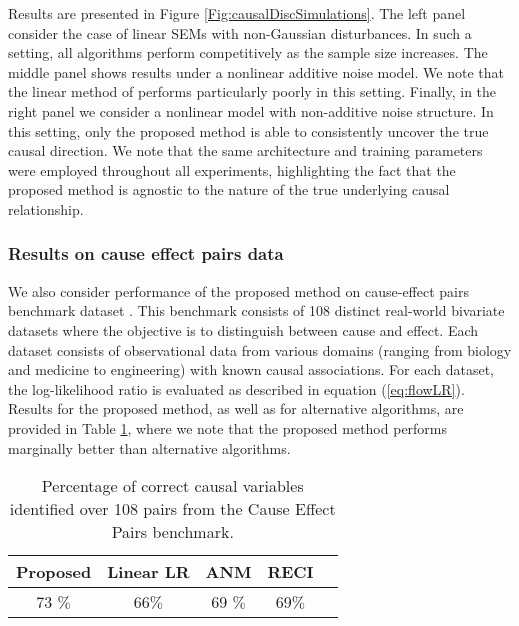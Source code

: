 \documentclass{article}
\begin{document}
Results are presented in Figure \ref{Fig:causalDiscSimulations}. 
The left panel consider the case of linear SEMs with non-Gaussian disturbances. In such a setting, all
algorithms perform competitively as the sample size increases. 
The middle panel shows results under a nonlinear additive noise model.
We note that the linear method of \cite{Hyvarinen2013} performs particularly 
poorly in this setting. 
Finally, in the right panel we consider a nonlinear model with non-additive noise structure. 
In this setting, only the proposed method is able to consistently uncover the true causal direction. 
We note that the same 
architecture and training parameters were employed throughout all experiments,
highlighting the fact that the 
proposed method is agnostic to the nature of the true 
underlying causal relationship. 


\subsubsection*{Results on cause effect pairs data}

We also consider performance of the proposed method on cause-effect pairs benchmark dataset
\citep{mooij2016distinguishing}. 
This benchmark consists of  108 distinct  
real-world  bivariate datasets where the objective is to distinguish between cause and effect.
Each dataset consists of observational data from various domains (ranging from biology and medicine to engineering) with known causal associations. 
For each dataset,  the log-likelihood ratio is evaluated as described in equation 
(\ref{eq:flowLR}). 
%
Results for the proposed method, as well as for alternative algorithms, are provided in Table 
\ref{sample-table}, where we note that the proposed method performs marginally better than alternative 
algorithms. 

\begin{table}[h!]
	\caption{Percentage of correct 
		causal variables identified over 108 pairs from the Cause Effect Pairs benchmark.}
	\label{sample-table}
	\vskip 0.15in
	\begin{center}
		\begin{small}
			\begin{sc}
				\begin{tabular}{ccccr}
					\toprule
					Proposed & Linear LR & ANM  & RECI    \\
					\midrule
					73 $\%$ & 66$\%$ & 69 $\%$   &  69$\%$ \\
					\bottomrule
				\end{tabular}
			\end{sc}
		\end{small}
	\end{center}
	\vskip -0.1in
\end{table}
\end{document}
